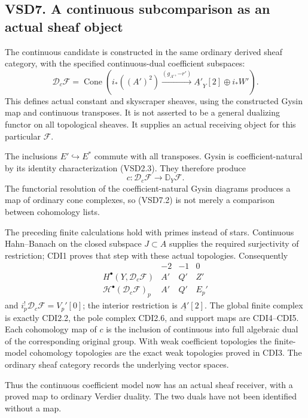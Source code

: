 \subsection{VSD7. A continuous subcomparison as an actual sheaf
object}\label{vsd7.-a-continuous-subcomparison-as-an-actual-sheaf-object}

The continuous candidate is constructed in the same ordinary derived
sheaf category, with the specified continuous-dual coefficient
subspaces: \[
\mathscr D_c\mathscr F=
\operatorname{Cone}\left(
i_*((A')^2)\xrightarrow{(g_{A'},-r')}
\underline{A'}_Y[2]\oplus i_*W'\right).
\tag{VSD7.1}
\] This defines actual constant and skyscraper sheaves, using the
constructed Gysin map and continuous transposes. It is not asserted to
be a general dualizing functor on all topological sheaves. It supplies
an actual receiving object for this particular \(\mathscr F\).

The inclusions \(E'\hookrightarrow E^*\) commute with all transposes.
Gysin is coefficient-natural by its identity characterization (VSD2.3).
They therefore produce \[
\boxed{c:\mathscr D_c\mathscr F\longrightarrow\mathbb D_Y\mathscr F.}
\tag{VSD7.2}
\] The functorial resolution of the coefficient-natural Gysin diagrams
produces a map of ordinary cone complexes, so (VSD7.2) is not merely a
comparison between cohomology lists.

The preceding finite calculations hold with primes instead of stars.
Continuous Hahn--Banach on the closed subspace \(J\subset A\) supplies
the required surjectivity of restriction; CDI1 proves that step with
these actual topologies. Consequently \[
\begin{array}{c|ccc}
 &-2&-1&0\\ \hline
H^\bullet(Y,\mathscr D_c\mathscr F)&A'&Q'&Z'\\
\mathcal H^\bullet(\mathscr D_c\mathscr F)_p&A'&Q'&E_p'
\end{array}
\tag{VSD7.3}
\] and \(i_p^!\mathscr D_c\mathscr F=V_p'[0]\); the interior restriction
is \(\underline{A'}[2]\). The global finite complex is exactly CDI2.2,
the pole complex CDI2.6, and support maps are CDI4--CDI5. Each
cohomology map of \(c\) is the inclusion of continuous into full
algebraic dual of the corresponding original group. With weak
coefficient topologies the finite-model cohomology topologies are the
exact weak topologies proved in CDI3. The ordinary sheaf category
records the underlying vector spaces.

Thus the continuous coefficient model now has an actual sheaf receiver,
with a proved map to ordinary Verdier duality. The two duals have not
been identified without a map.

